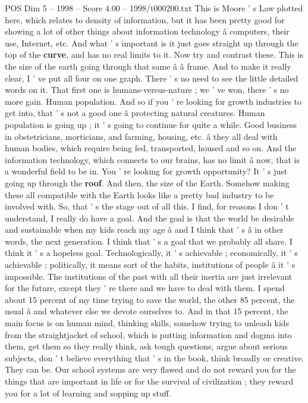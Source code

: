 \begin{textsample}{POS Dim 5 – 1998 – Score 4.00 – 1998/t000200.txt}
This is Moore ' s Law plotted here, which relates to density of information, but it has been pretty good for showing a lot of other things about information technology â computers, their use, Internet, etc.
And what ' s important is it just goes straight up through the top of the \textbf{curve}, and has no real limits to it.
Now try and contrast these.
This is the size of the earth going through that same â â frame.
And to make it really clear, I ' ve put all four on one graph.
There ' s no need to see the little detailed words on it.
That first one is humans-versus-nature ; we ' ve won, there ' s no more gain.
Human population.
And so if you ' re looking for growth industries to get into, that ' s not a good one â protecting natural creatures.
Human population is going up ; it ' s going to continue for quite a while.
Good business in obstetricians, morticians, and farming, housing, etc. â they all deal with human bodies, which require being fed, transported, housed and so on.
And the information technology, which connects to our brains, has no limit â now, that is a wonderful field to be in.
You ' re looking for growth opportunity?
It ' s just going up through the \textbf{roof}.
And then, the size of the Earth.
Somehow making these all compatible with the Earth looks like a pretty bad industry to be involved with.
So, that ' s the stage out of all this.
I find, for reasons I don ' t understand, I really do have a goal.
And the goal is that the world be desirable and sustainable when my kids reach my age â and I think that ' s â in other words, the next generation.
I think that ' s a goal that we probably all share.
I think it ' s a hopeless goal.
Technologically, it ' s achievable ; economically, it ' s achievable ; politically, it means sort of the habits, institutions of people â it ' s impossible.
The institutions of the past with all their inertia are just irrelevant for the future, except they ' re there and we have to deal with them.
I spend about 15 percent of my time trying to save the world, the other 85 percent, the usual â and whatever else we devote ourselves to.
And in that 15 percent, the main focus is on human mind, thinking skills, somehow trying to unleash kids from the straightjacket of school, which is putting information and dogma into them, get them so they really think, ask tough questions, argue about serious subjects, don ' t believe everything that ' s in the book, think broadly or creative.
They can be.
Our school systems are very flawed and do not reward you for the things that are important in life or for the survival of civilization ; they reward you for a lot of learning and sopping up stuff.

\end{textsample}
